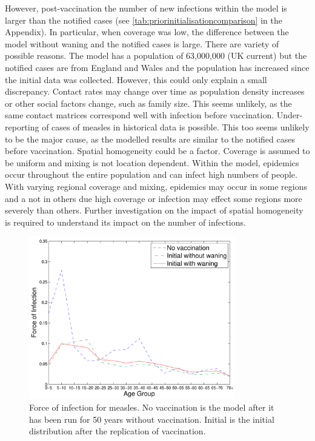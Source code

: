 \documentclass[a4paper,11pt] {scrartcl}
\begin{document}
However, post-vaccination the number of new infections within the model is larger than the notified cases (see \autoref{tab:priorinitialisationcomparison} in the Appendix). In particular, when coverage was low, the difference between the model without waning and the notified cases is large. There are variety of possible reasons. The model has a population of 63,000,000 (UK current) but the notified cases are from England and Wales and the population has increased since the initial data was collected. However, this could only explain a small discrepancy. Contact rates may change over time as population density increases or other social factors change, such as family size. This seems unlikely, as the same contact matrices correspond well with infection before vaccination. Under-reporting of cases of measles in historical data is possible. This too seems unlikely to be the major cause, as the modelled results are similar to the notified cases before vaccination. Spatial homogeneity could be a factor. Coverage is assumed to be uniform and mixing is not location dependent. Within the model, epidemics occur throughout the entire population and can infect high numbers of people. With varying regional coverage and mixing, epidemics may occur in some regions and a not in others due high coverage or infection may effect some regions more severely than others. Further investigation on the impact of spatial homogeneity is required to understand its impact on the number of infections.
\begin{figure}[h]
	\centering
	\includegraphics[width=90mm]{forceofinfectioncomparison}
	\caption{Force of infection for measles. No vaccination is the model after it has been run for 50 years without vaccination. Initial is the initial distribution after the replication of vaccination.}
	\label{fig:estimateparametersforceofinfection}
\end{figure}
\end{document}
